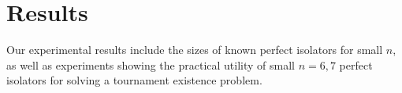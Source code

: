 \documentclass[conference]{IEEEtran}
\begin{document}

%

\section{Results}

Our experimental results include the sizes of known perfect isolators for small $n$, as well as experiments showing the practical utility of small $n=6,7$ perfect isolators for solving a tournament existence problem.
\end{document}
